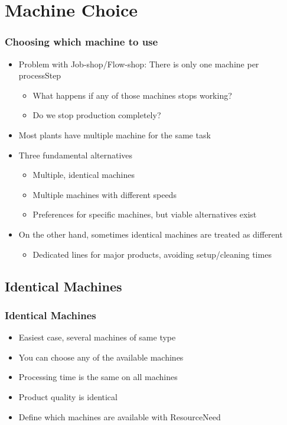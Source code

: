 \section{Machine Choice}

\begin{frame}
\frametitle{Choosing which machine to use}
\begin{itemize}
\item Problem with Job-shop/Flow-shop: There is only one machine per processStep
\begin{itemize}
\item What happens if any of those machines stops working?
\item Do we stop production completely?
\end{itemize}
\item Most plants have multiple machine for the same task
\item Three fundamental alternatives
\begin{itemize}
\item Multiple, identical machines
\item Multiple machines with different speeds
\item Preferences for specific machines, but viable alternatives exist
\end{itemize}
\item On the other hand, sometimes identical machines are treated as different
\begin{itemize}
\item Dedicated lines for major products, avoiding setup/cleaning times
\end{itemize}
\end{itemize}
\end{frame}


\subsection{Identical Machines}

\begin{frame}
\frametitle{Identical Machines \avail}
\begin{itemize}
\item Easiest case, several machines of same type
\item You can choose any of the available machines
\item Processing time is the same on all machines
\item Product quality is identical
\item Define which machines are available with ResourceNeed
\end{itemize}
\end{frame}


